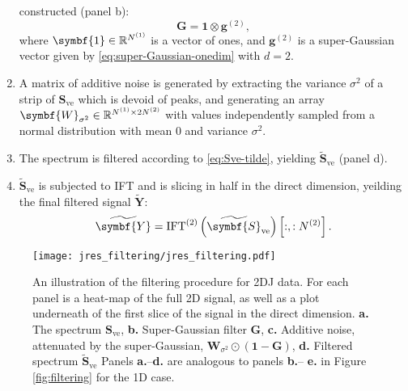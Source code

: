 \begin{enumerate}
        constructed (panel b):
        \begin{equation}
            \symbf{G} = \symbf{1} \otimes \symbf{g}^{(2)},
        \end{equation}
        where $\symbf{1} \in \mathbb{R}^{\None}$ is a vector of ones, and
        $\symbf{g}^{(2)}$ is a super-Gaussian vector given by
        \eqref{eq:super-Gaussian-onedim} with $d=2$.
    \item A matrix of additive noise is generated by extracting the variance
        $\sigma^2$ of a strip of $\symbf{S}_{\text{ve}}$ which is devoid of
        peaks, and generating an array $\symbf{W}_{\sigma^2} \in
        \mathbb{R}^{\None \times 2 \Ntwo}$ with values independently sampled
        from a normal distribution with mean $0$ and variance  $\sigma^2$.
    \item The spectrum is filtered according to \eqref{eq:Sve-tilde}, yielding
        $\widetilde{\symbf{S}}_{\text{ve}}$ (panel d).
    \item $\widetilde{\symbf{S}}_{\text{ve}}$ is subjected to \ac{IFT} and is
        slicing in half in the direct dimension, yeilding the final filtered
        signal $\widetilde{\symbf{Y}}$:
        \begin{equation}
            \widetilde{\symbf{Y}} = \IFT^{(2)}\left(\widetilde{\symbf{S}}_{\text{ve}}\right) \left[:, : \Ntwo\right].
        \end{equation}
\end{enumerate}

\begin{figure}
    \centering
    \texttt{[image: jres\_filtering/jres\_filtering.pdf]}
    \caption[
        An illustration of the filtering procedure for \ac{2DJ} data.
    ]
    {
        An illustration of the filtering procedure for \ac{2DJ} data.
        For each panel is a heat-map of the full \ac{2D} signal, as well as a
        plot underneath of the first slice of the signal in the direct
        dimension.
        \textbf{a.} The spectrum $\symbf{S}_{\text{ve}}$,
        \textbf{b.} Super-Gaussian filter $\symbf{G}$,
        \textbf{c.} Additive noise, attenuated by the super-Gaussian, $\symbf{W}_{\sigma^2} \odot (\symbf{1} - \symbf{G})$,
        \textbf{d.} Filtered spectrum $\widetilde{\symbf{S}}_{\text{ve}}$
        Panels \textbf{a.}--\textbf{d.} are analogous to panels \textbf{b.}--
        \textbf{e.} in Figure \ref{fig:filtering} for the \ac{1D} case.
    }
    \label{fig:jres-filtering}
\end{figure}

